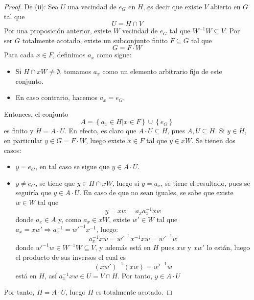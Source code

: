 \documentclass[12pt]{report}
\theoremstyle{largebreak}
\begin{document}
\begin{proof}
        De (ii): Sea $U$ una vecindad de $e_G$ en $H$, es decir que existe $V$ abierto en $G$ tal que
        \begin{equation*}
            U=H\cap V
        \end{equation*}
        Por una proposición anterior, existe $W$ vecindad de $e_G$ tal que $W^{-1}W\subseteq V$. Por ser $G$ totalmente acotado, existe un subconjunto finito $F\subseteq G$ tal que
        \begin{equation*}
            G=F\cdot W
        \end{equation*}
        Para cada $x\in F$, definimos $a_x$ como sigue:
        \begin{itemize}
            \item Si $H\cap xW\neq\emptyset$, tomamos $a_x$ como un elemento arbitrario fijo de este conjunto.
            \item En caso contrario, hacemos $a_x=e_G$.
        \end{itemize} 
        Entonces, el conjunto
        \begin{equation*}
            A=\left\{a_x\in H\Big|x\in F \right\}\cup\left\{ e_G\right\}
        \end{equation*}
        es finito y $H=A\cdot U$. En efecto, es claro que $A\cdot U\subseteq H$, pues $A,U\subseteq H$. Si $y\in H$, en particular $y\in G=F\cdot W$, luego existe $x\in F$ tal que $y\in xW$. Se tienen dos casos:
        \begin{itemize}
            \item $y=e_G$, en tal caso se sigue que $y\in A\cdot U$.
            \item $y\neq e_G$, se tiene que $y\in H\cap xW$, luego si $y=a_x$, se tiene el resultado, pues se seguiría que $y\in A\cdot U$. En caso de que no sean iguales, se sabe que existe $w\in W$ tal que
            \begin{equation*}
                y=xw=a_xa_x^{-1}xw
            \end{equation*}
            donde $a_x\in A$ y, como $a_x\in xW$, existe $w'\in W$ tal que $a_x=xw'\Rightarrow a_x^{-1}=w'^{-1}x^{-1}$, luego:
            \begin{equation*}
                a_x^{-1}xw=w'^{-1}x^{-1}xw=w'^{-1}w
            \end{equation*}
            donde $w'^{-1}w\in W^{-1}W\subseteq V$, y además está en $H$ pues $xw$ y $xw'$ lo están, luego el producto de sus inversos el cual es
            \begin{equation*}
                (xw')^{-1}(xw)=w'^{-1}w
            \end{equation*}
            está en $H$, así $a_x^{-1}xw\in U=V\cap H$. Por tanto, $y\in A\cdot U$
        \end{itemize}
        Por tanto, $H=A\cdot U$, luego $H$ es totalmente acotado.


\end{proof}
\end{document}
